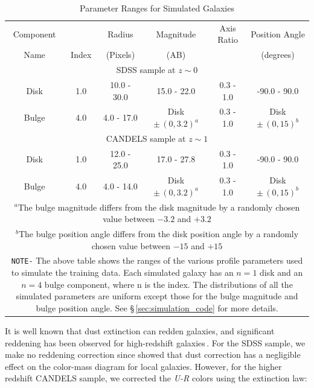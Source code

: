 \begin{table}[htbp]
\centering
\caption{Parameter Ranges for Simulated Galaxies  \label{tab:sim_para}}
\begin{tabular}{cccccc}
\hline
\hline
Component& \sersic{} & Radius & Magnitude & Axis Ratio & Position Angle \\ 
Name & Index & (Pixels) & (AB) &  & (degrees) \\
\hline
\hline
\multicolumn{6}{c}{SDSS sample at $z \sim 0$} \\
    \hline
    Disk & 1.0 & 10.0 - 30.0 & 15.0 - 22.0 & 0.3 - 1.0 & -90.0 - 90.0 \\
    Bulge & 4.0 & 4.0 - 17.0 & Disk $\pm\,(0,3.2)^{a}$ & 0.3 - 1.0 & Disk $\pm\,(0,15)^{b}$\\
    \hline
    \hline
    \multicolumn{6}{c}{CANDELS sample at $z \sim 1$} \\
    \hline
    Disk & 1.0 & 12.0 - 25.0 & 17.0 - 27.8 & 0.3 - 1.0 & -90.0 - 90.0\\
    Bulge & 4.0 & 4.0 - 14.0 & Disk $\pm\,(0,3.2)^{a}$ & 0.3 - 1.0 &  Disk $\pm\,(0,15)^{b}$ \\
    \hline
    \multicolumn{6}{p{0.9\textwidth}}{\vskip 0.01cm \small $^a$The bulge magnitude differs from the disk magnitude by a randomly chosen value between $-3.2$ and $+3.2$}\\
    \multicolumn{6}{p{0.9\textwidth}}{\small$^b$The bulge position angle differs from the disk position angle by a randomly chosen value between $-15$ and $+15$}\\
    \multicolumn{6}{p{0.9\textwidth}}{\small \texttt{NOTE-} The above table shows the ranges of the various \sersic{} profile parameters used to simulate the training data. Each simulated galaxy has an $n=1$ disk and an $n = 4 $ bulge component, where n is the \sersic{} index. The distributions of all the simulated parameters are uniform except those for the bulge magnitude and bulge position angle. See \S\,\ref{sec:simulation_code} for more details.}\\
\end{tabular}
\end{table}


It is well known that dust extinction can redden galaxies, and significant reddening has been observed for high-redshift galaxies\,\citep{brammer_09,williams_09,cardamone_10}. For the SDSS sample, we make no reddening correction since \citet{schawinski_14_green_herring} showed that dust correction has a negligible effect on the color-mass diagram for local galaxies. However, for the higher redshift CANDELS sample, we corrected the \textit{U-R} colors using the \citet{calzetti_00} extinction law:


